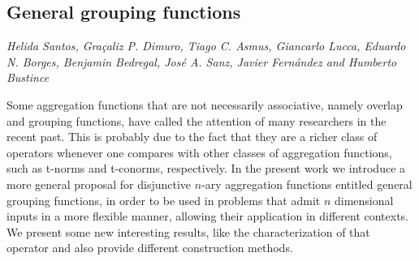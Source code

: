 \documentclass[../booklet.tex]{subfiles}
\begin{document}
\subsection[General grouping functions. {\it Helida Santos, Graçaliz P. Dimuro, Tiago C. Asmus, Giancarlo Lucca, Eduardo N. Borges, Benjamin Bedregal, José A. Sanz, Javier Fernández and Humberto Bustince}]{General grouping functions}
        

\begin{center}
  {\it Helida Santos, Graçaliz P. Dimuro, Tiago C. Asmus, Giancarlo Lucca, Eduardo N. Borges, Benjamin Bedregal, José A. Sanz, Javier Fernández and Humberto Bustince}
\end{center}



Some aggregation functions that are not necessarily associative, namely overlap and grouping functions, have called the attention of many researchers in the recent past. This is probably due to the fact that they are a richer class of operators whenever one compares with other classes of aggregation functions, such as t-norms and t-conorms, respectively. In the present work we introduce a more general proposal for disjunctive $n$-ary aggregation functions entitled general grouping functions, in order to be used in problems that admit $n$ dimensional inputs in a more flexible manner, allowing their application in different contexts. We present some new interesting results, like the characterization of that operator and also provide different construction methods.

\end{document}
